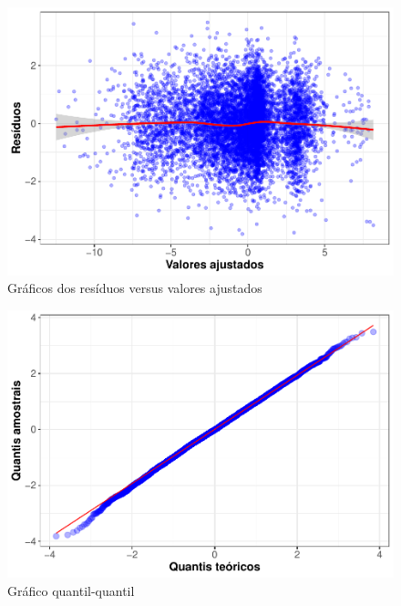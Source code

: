 \documentclass[twocolumn]{rbef}
\newcommand{\1}{\mathbbm{1}}
\begin{document}
\begin{figure}

{\centering \includegraphics[width=1\linewidth]{article_files/figure-latex/resplot-1} 

}

\caption{Gráficos dos resíduos versus valores ajustados}\label{fig:resplot}
\end{figure}

\begin{figure}

{\centering \includegraphics[width=1\linewidth]{article_files/figure-latex/qqplot-1} 

}

\caption{Gráfico quantil-quantil}\label{fig:qqplot}
\end{figure}
\end{document}
